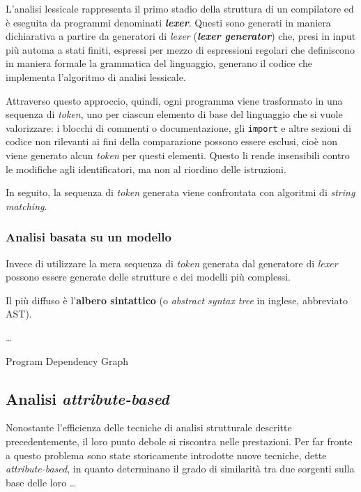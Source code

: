 L'analisi lessicale rappresenta il primo stadio della struttura di un compilatore ed è eseguita da programmi denominati \textbf{\textit{lexer}}. 
%
Questi sono generati in maniera dichiarativa a partire da generatori di \textit{lexer} (\textbf{\textit{lexer generator}}) che, presi in input più automa a stati finiti, espressi per mezzo di espressioni regolari che definiscono in maniera formale la grammatica del linguaggio, generano il codice che implementa l'algoritmo di analisi lessicale. 

Attraverso questo approccio, quindi, ogni programma viene trasformato in una sequenza di \textit{token}, uno per ciascun elemento di base del linguaggio che si vuole valorizzare: i blocchi di commenti o documentazione, gli \texttt{import} e altre sezioni di codice non rilevanti ai fini della comparazione possono essere esclusi, cioè non viene generato alcun \textit{token} per questi elementi.
%
Questo li rende insensibili contro le modifiche agli identificatori, ma non al riordino delle istruzioni.





In seguito, la sequenza di \textit{token} generata viene confrontata con algoritmi di \textit{string matching}.

\subsubsection{Analisi basata su un modello}
Invece di utilizzare la mera sequenza di \textit{token} generata dal generatore di \textit{lexer} possono essere generate delle strutture e dei modelli più complessi.

Il più diffuso è l'\textbf{albero sintattico} (o \textit{abstract syntax tree} in inglese, abbreviato AST).

\dots

Program Dependency Graph

\subsection{Analisi \textit{attribute-based}}
Nonostante l'efficienza delle tecniche di analisi strutturale descritte precedentemente, il loro punto debole si riscontra nelle prestazioni. 
%
Per far fronte a questo problema sono state storicamente introdotte nuove tecniche, dette \textit{attribute-based}, in quanto determinano il grado di similarità tra due sorgenti sulla base delle loro \dots

